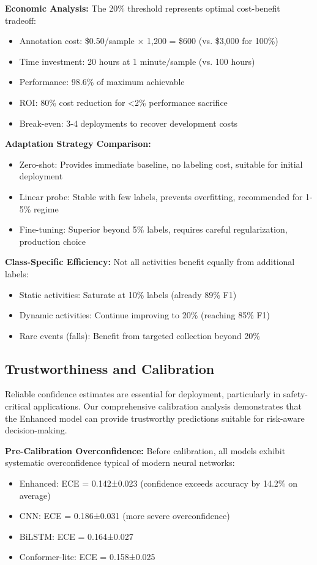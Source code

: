 \documentclass[journal]{IEEEtran}
\begin{document}
\textbf{Economic Analysis:}
The 20\% threshold represents optimal cost-benefit tradeoff:
\begin{itemize}
\item Annotation cost: \$0.50/sample × 1,200 = \$600 (vs. \$3,000 for 100\%)
\item Time investment: 20 hours at 1 minute/sample (vs. 100 hours)
\item Performance: 98.6\% of maximum achievable
\item ROI: 80\% cost reduction for <2\% performance sacrifice
\item Break-even: 3-4 deployments to recover development costs
\end{itemize}

\textbf{Adaptation Strategy Comparison:}
\begin{itemize}
\item Zero-shot: Provides immediate baseline, no labeling cost, suitable for initial deployment
\item Linear probe: Stable with few labels, prevents overfitting, recommended for 1-5\% regime
\item Fine-tuning: Superior beyond 5\% labels, requires careful regularization, production choice
\end{itemize}

\textbf{Class-Specific Efficiency:}
Not all activities benefit equally from additional labels:
\begin{itemize}
\item Static activities: Saturate at 10\% labels (already 89\% F1)
\item Dynamic activities: Continue improving to 20\% (reaching 85\% F1)
\item Rare events (falls): Benefit from targeted collection beyond 20\%
\end{itemize}

\subsection{Trustworthiness and Calibration}
Reliable confidence estimates are essential for deployment, particularly in safety-critical applications. Our comprehensive calibration analysis demonstrates that the Enhanced model can provide trustworthy predictions suitable for risk-aware decision-making.

\textbf{Pre-Calibration Overconfidence:}
Before calibration, all models exhibit systematic overconfidence typical of modern neural networks:
\begin{itemize}
\item Enhanced: ECE = 0.142±0.023 (confidence exceeds accuracy by 14.2\% on average)
\item CNN: ECE = 0.186±0.031 (more severe overconfidence)
\item BiLSTM: ECE = 0.164±0.027
\item Conformer-lite: ECE = 0.158±0.025
\end{itemize}
\end{document}
